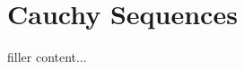 \documentclass[../../templates/section]{subfiles}
\begin{document}
\section{Cauchy Sequences}\label{sec:cauchy-sequences}

filler content...
\end{document}

